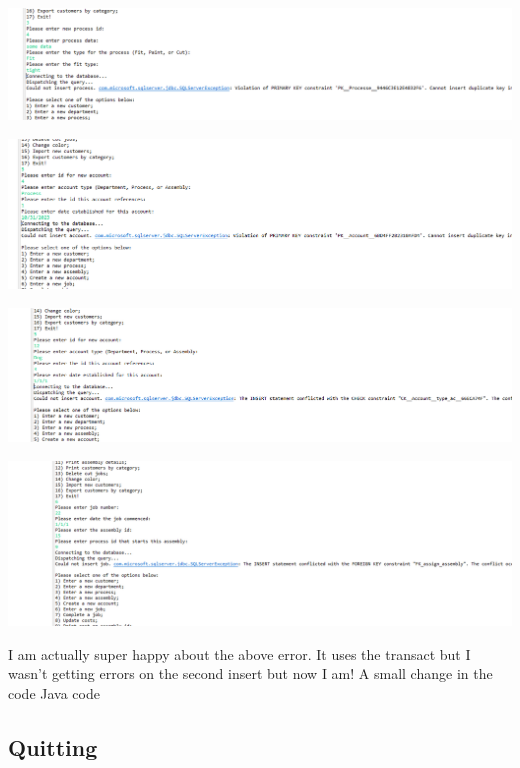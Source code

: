 \documentclass[11pt]{article}
\begin{document}
\includegraphics[width = \textwidth]{error3.png}

\includegraphics[width = \textwidth]{error4.png}

\includegraphics[width = \textwidth]{error5.png}

\includegraphics[width = \textwidth]{job4.png}

I am actually super happy about the above error.  It uses the transact but I wasn't getting errors on the second insert but now I am!  A small change in the code Java code




\subsection{Quitting}
\end{document}
